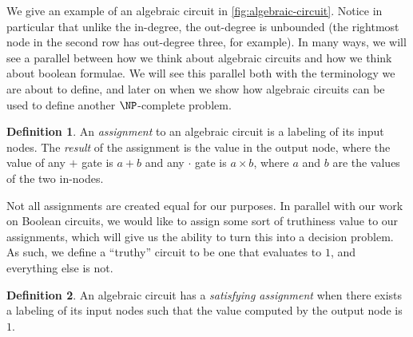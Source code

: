 \documentclass[english,12pt]{reedthesis}
\theoremstyle{plain}
\theoremstyle{definition}
\newtheorem{defn}[defn]{Definition}
\theoremstyle{remark}
\begin{document}
We give an example of an algebraic circuit in \cref{fig:algebraic-circuit}.
Notice in particular that unlike the in-degree, the out-degree is unbounded (the
rightmost node in the second row has out-degree three, for example). In many
ways, we will see a parallel between how we think about algebraic circuits and
how we think about boolean formulae. We will see this parallel both with the
terminology we are about to define, and later on when we show how algebraic
circuits can be used to define another $\NP$-complete problem.

\begin{defn}\label{def:alg-assignment}
  An \emph{assignment} to an algebraic circuit is a labeling of its input nodes.
  The \emph{result} of the assignment is the value in the output node, where the
  value of any $+$ gate is $a+b$ and any $\cdot$ gate is $a \times b$, where $a$ and $b$
  are the values of the two in-nodes.
\end{defn}

Not all assignments are created equal for our purposes. In parallel with our
work on Boolean circuits, we would like to assign some sort of truthiness value
to our assignments, which will give us the ability to turn this into a decision
problem. As such, we define a ``truthy'' circuit to be one that evaluates to
$1$, and everything else is not.

\begin{defn}\label{def:alg-circuit-sat}
  An algebraic circuit has a \emph{satisfying assignment} when there exists a
  labeling of its input nodes such that the value computed by the output node is
  $1$.
\end{defn}
\end{document}
